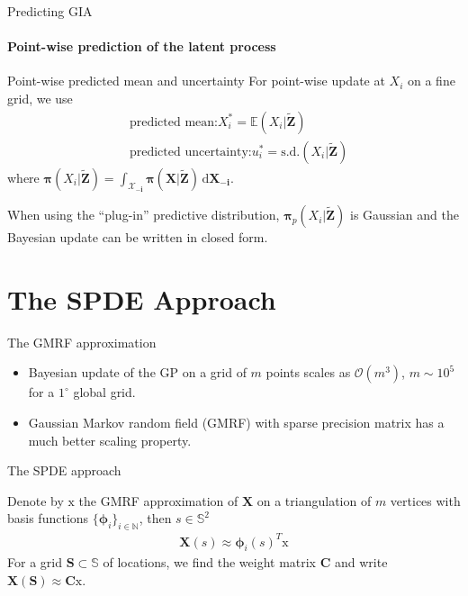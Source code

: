 \documentclass{beamer}
\newcommand{\ud}{\,\mathrm{d}}
\begin{document}
\begin{frame}{Predicting GIA}
\framesubtitle{Point-wise prediction of the latent process}
\begin{block}{Point-wise predicted mean and uncertainty}
For point-wise update at $X_i$ on a fine grid, we use 
\begin{align*}
&\mbox{predicted mean:} X_i^* = \mathbb{E}(X_i| \bm{\tilde{Z}}) \\
&\mbox{predicted uncertainty:} u_i^* = \mbox{s.d.}(X_i| \bm{\tilde{Z}})
\end{align*}
where $\bm{\pi}(X_i | \bm{\tilde{Z}}) = \int_{\bm{\mathcal{X}_{-i}}} \bm{\pi}(\bm{X} | \bm{\tilde{Z}}) \ud \bm{X_{-i}}$.

\end{block}
When using the ``plug-in'' predictive distribution, $\bm{\pi}_{p}(X_i | \bm{\tilde{Z}})$ is Gaussian and the Bayesian update can be written in closed form.
\end{frame}




\section{The SPDE Approach}
\begin{frame}{The GMRF approximation}
\begin{itemize}
\item Bayesian update of the GP on a grid of $m$ points scales as $\mathcal{O}(m^3)$, $m \sim 10^5$ for a $1^\circ $ global grid.
\item Gaussian Markov random field (GMRF) with sparse precision matrix has a much better scaling property.
\end{itemize}

\begin{block}{The SPDE approach \citep{Lindgren2011}} 

Denote by $\bm{\mathrm{x}}$ the GMRF approximation of $\bm{X}$ on a triangulation of $m$ vertices with basis functions $\{ \bm{\phi}_i \}_{i \in \mathbb{N}}$, then  $s \in \mathbb{S}^2$
\begin{align}
\bm{X}(s) \approx \bm{\phi}_i(s)^T\bm{\mathrm{x}}
\end{align}
For a grid $\bm{S} \subset \mathbb{S}$ of locations, we find the weight matrix $\bm{C}$ and write $\bm{X}(\bm{S}) \approx \bm{C}\bm{\mathrm{x}}$.
\end{block}
\end{frame}
\end{document}
